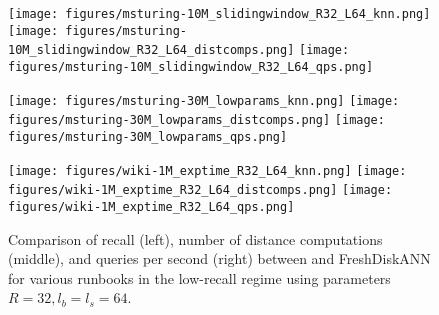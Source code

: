 \begin{figure*}[t]
    \centering
    \texttt{[image: figures/msturing-10M\_slidingwindow\_R32\_L64\_knn.png]}
    \hfill
    \texttt{[image: figures/msturing-10M\_slidingwindow\_R32\_L64\_distcomps.png]}
    \hfill
    \texttt{[image: figures/msturing-10M\_slidingwindow\_R32\_L64\_qps.png]}

    \centering
    \texttt{[image: figures/msturing-30M\_lowparams\_knn.png]}
    \hfill
    \texttt{[image: figures/msturing-30M\_lowparams\_distcomps.png]}
    \hfill
    \texttt{[image: figures/msturing-30M\_lowparams\_qps.png]}

    \centering
    \texttt{[image: figures/wiki-1M\_exptime\_R32\_L64\_knn.png]}
    \hfill
    \texttt{[image: figures/wiki-1M\_exptime\_R32\_L64\_distcomps.png]}
    \hfill
    \texttt{[image: figures/wiki-1M\_exptime\_R32\_L64\_qps.png]}
    \vspace{-7pt}
    \caption{Comparison of recall (left), number of distance computations (middle),
    and queries per second (right)
    between \name  and FreshDiskANN for 
    various runbooks in the low-recall regime using parameters $R=32, l_b=l_s=64$.}
    \label{fig:lowrecallplots}
\end{figure*}